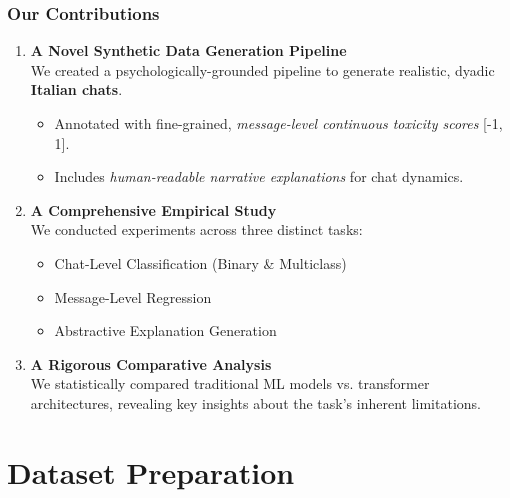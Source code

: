 \documentclass[aspectratio=169]{beamer}
\begin{document}
\begin{frame}
  \frametitle{Our Contributions}
  
  \begin{enumerate}
    \item \textbf{A Novel Synthetic Data Generation Pipeline} \\
    We created a psychologically-grounded pipeline to generate realistic, dyadic \textbf{Italian chats}.
    \begin{itemize}
        \item Annotated with fine-grained, \textit{message-level continuous toxicity scores} [-1, 1].
        \item Includes \textit{human-readable narrative explanations} for chat dynamics.
    \end{itemize}
    \pause
    \item \textbf{A Comprehensive Empirical Study} \\
    We conducted experiments across three distinct tasks:
    \begin{itemize}
        \item Chat-Level Classification (Binary \& Multiclass)
        \item Message-Level Regression
        \item Abstractive Explanation Generation
    \end{itemize}
    \pause
    \item \textbf{A Rigorous Comparative Analysis} \\
    We statistically compared traditional ML models vs. transformer architectures, revealing key insights about the task's inherent limitations.
  \end{enumerate}
\end{frame}

\section{Dataset Preparation}
\end{document}
